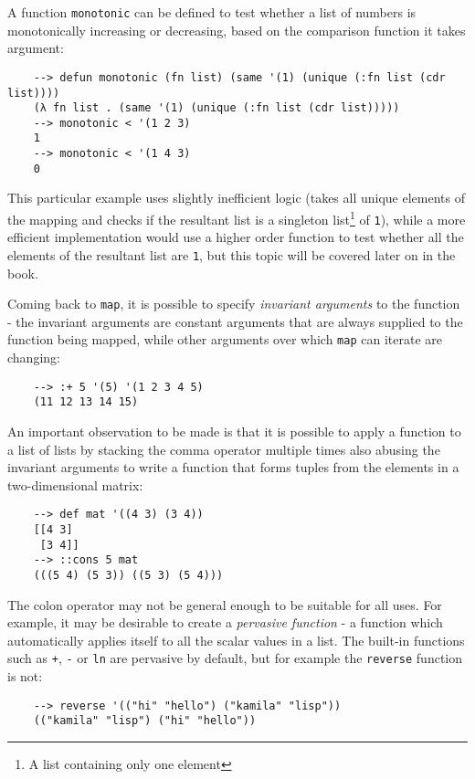 A function \verb|monotonic| can be defined to test whether a list of numbers is monotonically increasing or decreasing, based on the comparison function it takes argument:

\begin{Verbatim}
    --> defun monotonic (fn list) (same '(1) (unique (:fn list (cdr list))))
    (λ fn list . (same '(1) (unique (:fn list (cdr list)))))
    --> monotonic < '(1 2 3)
    1
    --> monotonic < '(1 4 3)
    0
\end{Verbatim}

This particular example uses slightly inefficient logic (takes all unique elements of the mapping and checks if the resultant list is a singleton list\footnote{A list containing only one element} of \verb|1|), while a more efficient implementation would use a higher order function to test whether all the elements of the resultant list are \verb|1|, but this topic will be covered later on in the book.

Coming back to \verb|map|, it is possible to specify \textit{invariant arguments} to the function - the invariant arguments are constant arguments that are always supplied to the function being mapped, while other arguments over which \verb|map| can iterate are changing:

\begin{Verbatim}
    --> :+ 5 '(5) '(1 2 3 4 5)
    (11 12 13 14 15)
\end{Verbatim}

An important observation to be made is that it is possible to apply a function to a list of lists by stacking the comma operator multiple times also abusing the invariant arguments to write a function that forms tuples from the elements in a two-dimensional matrix:

\begin{Verbatim}
    --> def mat '((4 3) (3 4))
    [[4 3]
     [3 4]]
    --> ::cons 5 mat
    (((5 4) (5 3)) ((5 3) (5 4)))
\end{Verbatim}

The colon operator may not be general enough to be suitable for all uses. For example, it may be desirable to create a \textit{pervasive function} - a function which automatically applies itself to all the scalar values in a list. The built-in functions such as \verb|+|, \verb|-| or \verb|ln| are pervasive by default, but for example the \verb|reverse| function is not:

\begin{Verbatim}
    --> reverse '(("hi" "hello") ("kamila" "lisp"))
    (("kamila" "lisp") ("hi" "hello"))
\end{Verbatim}

